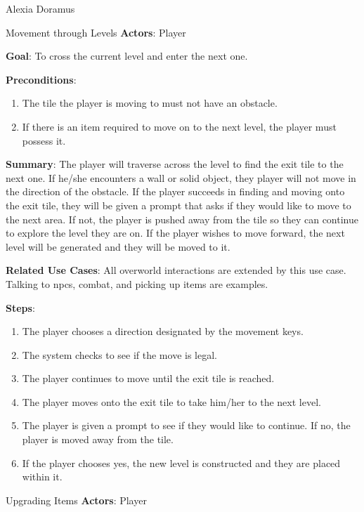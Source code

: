 \documentclass[12pt]{report}
\begin{document}
\begin{section}{Alexia Doramus}
\begin{subsection}{Movement through Levels}
\textbf{Actors}:
Player

\textbf{Goal}:
To cross the current level and enter the next one.

\textbf{Preconditions}:
\begin{enumerate}
\item The tile the player is moving to must not have an obstacle. 
\item If there is an item required to move on to the next level, the player must possess it.
\end{enumerate}

\textbf{Summary}:
The player will traverse across the level to find the exit tile to the next one. If he/she encounters a wall or solid object, they player will not move in the direction of the obstacle. If the player succeeds in finding and moving onto the exit tile, they will be given a prompt that asks if they would like to move to the next area. If not, the player is pushed away from the tile so they can continue to explore the level they are on. If the player wishes to move forward, the next level will be generated and they will be moved to it.

\textbf{Related Use Cases}:
All overworld interactions are extended by this use case. Talking to npcs, combat, and picking up items are examples.

\textbf{Steps}:
\begin{enumerate}
\item The player chooses a direction designated by the movement keys.
\item The system checks to see if the move is legal.
\item The player continues to move until the exit tile is reached.
\item The player moves onto the exit tile to take him/her to the next level.
\item The player is given a prompt to see if they would like to continue. If no, the player is moved away from the tile.
\item If the player chooses yes, the new level is constructed and they are placed within it.
\end{enumerate}
\end{subsection}

\begin{subsection}{Upgrading Items}
\textbf{Actors}:
Player


\end{subsection}
\end{section}
\end{document}
